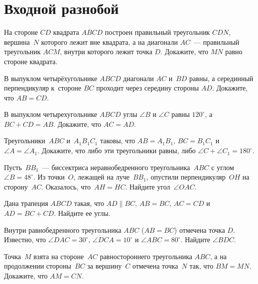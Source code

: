 

\section*{Входной разнобой}


\begin{problems}

\item
На стороне $CD$ квадрата $ABCD$ построен правильный треугольник $CDN$,
вершина~$N$ которого лежит вне квадрата, а на диагонали $AC$~--- правильный
треугольник $ACM$, внутри которого лежит точка $D$.
Докажите, что $MN$ равно стороне квадрата.

\item
В выпуклом четырёхугольнике $ABCD$ диагонали $AC$ и~$BD$ равны, а серединный
перпендикуляр к~стороне $BC$ проходит через середину стороны $AD$.
Докажите, что $AB = CD$.

\item
В выпуклом четырехугольнике $ABCD$ углы $\angle B$ и $\angle C$ равны
$120^\circ$, а $BC + CD = AB$.
Докажите, что $AC = AD$. 

\item
Треугольники~$ABC$ и~$A_1 B_1 C_1$ таковы, что $AB = A_1 B_1$, $BC = B_1 C_1$
и~$\angle A = \angle A_1$.
Докажите, что либо эти треугольники равны, либо
$\angle C + \angle C_1 = 180^{\circ}$.

\item
Пусть~$B B_1$~--- биссектриса неравнобедренного треугольника~$ABC$ с
углом~$\angle B = 48^{\circ}$.
Из точки~$O$, лежащей на луче~$BB_1$, опустили перпендикуляр~$OH$ на
сторону~$AC$.
Оказалось, что~$AH = HC$.
Найдите угол~$\angle OAC$.

\item
Дана трапеция $ABCD$ такая, что $AD \parallel BC$, $AB = BC$, $AC = CD$ и
$AD = BC + CD$.
Найдите ее углы.

\item
Внутри равнобедренного треугольника $ABC$ ($AB = BC$) отмечена точка $D$.
Известно, что $\angle DAC = 30^\circ$, $\angle DCA = 10^\circ$ и
$\angle ABC = 80^\circ$.
Найдите $\angle BDC$.

\item
Точка~$M$ взята на стороне~$AC$ равностороннего треугольника $ABC$, а на
продолжении стороны~$BC$ за вершину~$C$ отмечена точка~$N$ так, что $BM = MN$.
Докажите, что $AM = CN$.

\end{problems}

